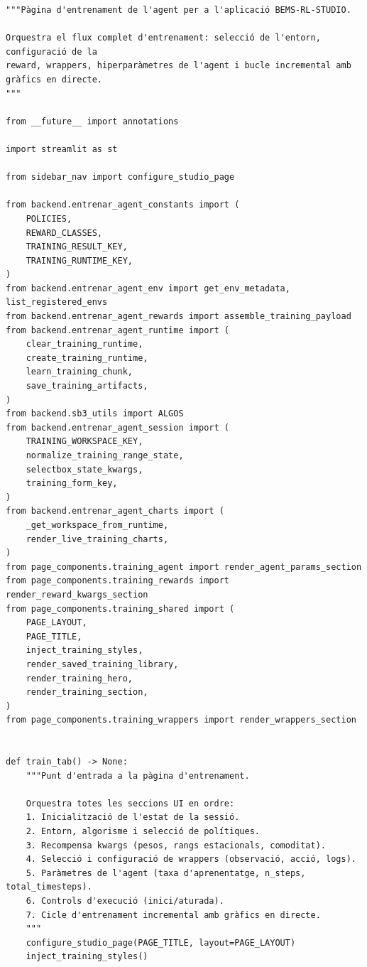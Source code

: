 \documentclass[10pt,a4paper]{article}
\begin{document}
\begin{lstlisting}[style=studioPython,caption={pages/Entrenar\_Agent.py},label={lst:pages-entrenar-agent-py}]
"""Pàgina d'entrenament de l'agent per a l'aplicació BEMS-RL-STUDIO.

Orquestra el flux complet d'entrenament: selecció de l'entorn, configuració de la
reward, wrappers, hiperparàmetres de l'agent i bucle incremental amb gràfics en directe.
"""

from __future__ import annotations

import streamlit as st

from sidebar_nav import configure_studio_page

from backend.entrenar_agent_constants import (
    POLICIES,
    REWARD_CLASSES,
    TRAINING_RESULT_KEY,
    TRAINING_RUNTIME_KEY,
)
from backend.entrenar_agent_env import get_env_metadata, list_registered_envs
from backend.entrenar_agent_rewards import assemble_training_payload
from backend.entrenar_agent_runtime import (
    clear_training_runtime,
    create_training_runtime,
    learn_training_chunk,
    save_training_artifacts,
)
from backend.sb3_utils import ALGOS
from backend.entrenar_agent_session import (
    TRAINING_WORKSPACE_KEY,
    normalize_training_range_state,
    selectbox_state_kwargs,
    training_form_key,
)
from backend.entrenar_agent_charts import (
    _get_workspace_from_runtime,
    render_live_training_charts,
)
from page_components.training_agent import render_agent_params_section
from page_components.training_rewards import render_reward_kwargs_section
from page_components.training_shared import (
    PAGE_LAYOUT,
    PAGE_TITLE,
    inject_training_styles,
    render_saved_training_library,
    render_training_hero,
    render_training_section,
)
from page_components.training_wrappers import render_wrappers_section


def train_tab() -> None:
    """Punt d'entrada a la pàgina d'entrenament.

    Orquestra totes les seccions UI en ordre:
    1. Inicialització de l'estat de la sessió.
    2. Entorn, algorisme i selecció de polítiques.
    3. Recompensa kwargs (pesos, rangs estacionals, comoditat).
    4. Selecció i configuració de wrappers (observació, acció, logs).
    5. Paràmetres de l'agent (taxa d'aprenentatge, n_steps, total_timesteps).
    6. Controls d'execució (inici/aturada).
    7. Cicle d'entrenament incremental amb gràfics en directe.
    """
    configure_studio_page(PAGE_TITLE, layout=PAGE_LAYOUT)
    inject_training_styles()


\end{lstlisting}
\end{document}
